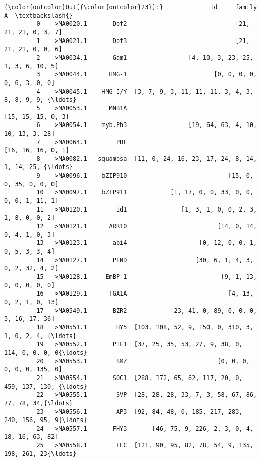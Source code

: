 \documentclass[11pt]{article}
\begin{document}
\begin{Verbatim}[commandchars=\\\{\}]
{\color{outcolor}Out[{\color{outcolor}23}]:}             id     family                                                  A  \textbackslash{}
         0    >MA0020.1       Dof2                              [21, 21, 21, 0, 3, 7]   
         1    >MA0021.1       Dof3                              [21, 21, 21, 0, 0, 6]   
         2    >MA0034.1       Gam1                 [4, 10, 3, 23, 25, 1, 3, 6, 10, 5]   
         3    >MA0044.1      HMG-1                        [0, 0, 0, 0, 0, 6, 3, 0, 0]   
         4    >MA0045.1    HMG-I/Y  [3, 7, 9, 3, 11, 11, 11, 3, 4, 3, 8, 8, 9, 9, {\ldots}   
         5    >MA0053.1      MNB1A                                 [15, 15, 15, 0, 3]   
         6    >MA0054.1    myb.Ph3                 [19, 64, 63, 4, 10, 10, 13, 3, 28]   
         7    >MA0064.1        PBF                                 [16, 16, 16, 0, 1]   
         8    >MA0082.1   squamosa  [11, 0, 24, 16, 23, 17, 24, 8, 14, 1, 14, 25, {\ldots}   
         9    >MA0096.1    bZIP910                            [15, 0, 0, 35, 0, 0, 0]   
         10   >MA0097.1    bZIP911            [1, 17, 0, 0, 33, 0, 0, 0, 0, 1, 11, 1]   
         11   >MA0120.1        id1               [1, 3, 1, 0, 0, 2, 3, 1, 8, 0, 0, 2]   
         12   >MA0121.1      ARR10                         [14, 0, 14, 0, 4, 1, 0, 3]   
         13   >MA0123.1       abi4                    [0, 12, 0, 0, 1, 0, 5, 3, 3, 4]   
         14   >MA0127.1       PEND                   [30, 6, 1, 4, 3, 0, 2, 32, 4, 2]   
         15   >MA0128.1     EmBP-1                          [9, 1, 13, 0, 0, 0, 0, 0]   
         16   >MA0129.1      TGA1A                            [4, 13, 0, 2, 1, 0, 13]   
         17   >MA0549.1       BZR2            [23, 41, 0, 89, 0, 0, 0, 3, 16, 17, 36]   
         18   >MA0551.1        HY5  [103, 108, 52, 9, 150, 0, 310, 3, 1, 0, 2, 4, {\ldots}   
         19   >MA0552.1       PIF1  [37, 25, 35, 53, 27, 9, 38, 0, 114, 0, 0, 0, 0{\ldots}   
         20   >MA0553.1        SMZ                         [0, 0, 0, 0, 0, 0, 135, 0]   
         21   >MA0554.1       SOC1  [288, 172, 65, 62, 117, 20, 0, 459, 137, 130, {\ldots}   
         22   >MA0555.1        SVP  [28, 28, 28, 33, 7, 3, 58, 67, 86, 77, 78, 34,{\ldots}   
         23   >MA0556.1        AP3  [92, 84, 48, 0, 185, 217, 283, 240, 156, 95, 9{\ldots}   
         24   >MA0557.1       FHY3       [46, 75, 9, 226, 2, 3, 0, 4, 18, 16, 63, 82]   
         25   >MA0558.1        FLC  [121, 90, 95, 82, 78, 54, 9, 135, 198, 261, 23{\ldots}   

\end{Verbatim}
\end{document}
